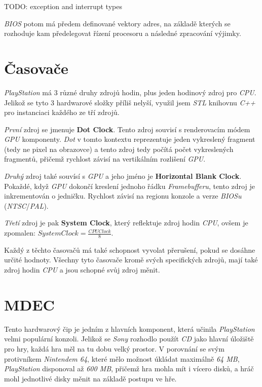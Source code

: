 TODO: exception and interrupt types

\textit{BIOS} potom má předem definované vektory adres, na základě kterých se rozhoduje kam předelegovat řízení procesoru
a následné zpracování výjimky.

\section{Časovače}

\textit{PlayStation} má 3 různé druhy zdrojů hodin, plus jeden hodinový zdroj pro \textit{CPU}. Jelikož
se tyto 3 hardwarové složky příliš nelyší, využil jsem \textit{STL} knihovnu \textit{C++} pro instanciaci
každého ze tří zdrojů. 

\textit{První} zdroj se jmenuje \textbf{Dot Clock}. Tento zdroj souvisí s renderovacím módem \textit{GPU}
komponenty. \textit{Dot} v tomto kontextu reprezentuje jeden vykreslený fragment (tedy ne pixel na obrazovce) a
tento zdroj tedy počítá počet vykreslených fragmentů, přičemž rychlost závisí na vertikálním rozlišení \textit{GPU}.

\textit{Druhý} zdroj také souvísí s \textit{GPU} a jeho jméno je \textbf{Horizontal Blank Clock}. Pokaždé, když \textit{GPU}
dokončí kreslení jednoho řádku \textit{Framebufferu}, tento zdroj je inkrementován o jedničku. Rychlost závisí na
regionu konzole a verze \textit{BIOSu} (\textit{NTSC}/\textit{PAL}).

\textit{Třetí} zdroj je pak \textbf{System Clock}, který reflektuje zdroj hodin \textit{CPU}, ovšem je zpomalen:
$SystemClock=\frac{CPUClock}{8}$.

Každý z těchto časovačů má také schopnost vyvolat přerušení, pokud se dosáhne určité hodnoty. Všechny tyto časovače
kromě svých specifických zdrojů, mají také zdroj hodin \textit{CPU} a jsou schopné svůj zdroj měnit.

\section{MDEC}

Tento hardwarový čip je jedním z hlavních komponent, která učinila \textit{PlayStation} velmi populární konzoli.
Jelikož se \textit{Sony} rozhodlo použít \textit{CD} jako hlavní úložiště pro hry, každá hra měl na tu dobu 
velký prostor. V porovnání se svým protivníkem \textit{Nintendem 64}, které mělo možnost úkládat maximálně \textit{64 MB},
\textit{PlayStation} disponoval až \textit{600 MB}, přičemž hra mohla mít i vícero disků, a hráč mohl jednotlivé
disky měnit na základě postupu ve hře.

